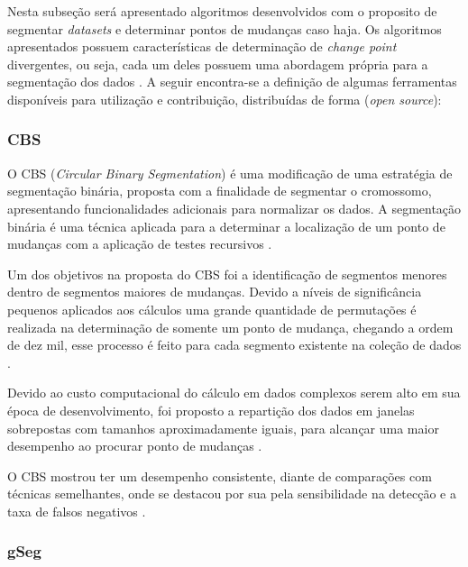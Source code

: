 Nesta subseção será apresentado algoritmos desenvolvidos com o proposito de segmentar \textit{datasets} e determinar pontos de mudanças caso haja. Os algoritmos apresentados possuem características de determinação de \textit{change point} divergentes, ou seja, cada um deles possuem uma abordagem própria para a segmentação dos dados \cite{Aminikhanghahi2017}. A seguir encontra-se a definição de algumas ferramentas disponíveis para utilização e contribuição, distribuídas de forma (\textit{open source}):

\subsubsection{CBS}

O CBS (\textit{Circular Binary Segmentation}) é uma modificação de uma estratégia de segmentação binária, proposta com a finalidade de segmentar o cromossomo, apresentando funcionalidades adicionais para normalizar os dados. A segmentação binária é uma técnica aplicada para a determinar a localização de um ponto de mudanças com a aplicação de testes recursivos \cite{Olshen2004}.

Um dos objetivos na proposta do CBS foi a identificação de segmentos menores dentro de segmentos maiores de mudanças. Devido a níveis de significância pequenos aplicados aos cálculos uma grande quantidade de permutações é realizada na determinação de somente um ponto de mudança, chegando a ordem de dez mil, esse processo é feito para cada segmento existente na coleção de dados \cite{Olshen2004}.

Devido ao custo computacional do cálculo em dados complexos serem alto em sua época de desenvolvimento, foi proposto a repartição dos dados em janelas sobrepostas com tamanhos aproximadamente iguais, para alcançar uma maior desempenho ao procurar ponto de mudanças \cite{Olshen2004}.

O CBS mostrou ter um desempenho consistente, diante de comparações com técnicas semelhantes, onde se destacou por sua pela sensibilidade na detecção e a taxa de falsos negativos \cite{Hsu2011}.


\subsubsection{gSeg}

